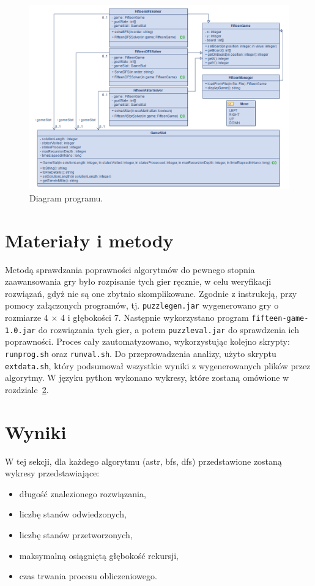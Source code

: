 \documentclass{classrep}
\begin{document}
    \clearpage

    \begin{figure}[!h]
        \includegraphics[width=\linewidth]{src/fifteen-diagram}
        \caption{Diagram programu.}
        \label{fig:fifteen-diagram}
    \end{figure}


    \section{Materiały i metody}\label{sec:materiay-i-metody}
    Metodą sprawdzania poprawności algorytmów do pewnego stopnia zaawansowania gry było rozpisanie tych gier ręcznie,
    w celu weryfikacji rozwiązań, gdyż nie są one zbytnio skomplikowane.
    Zgodnie z instrukcją, przy pomocy załączonych programów, tj. \texttt{puzzlegen.jar} wygenerowano gry o rozmiarze
    4 × 4 i głębokości 7.
    Następnie wykorzystano program \texttt{fifteen-game-1.0.jar} do rozwiązania tych gier, a potem \texttt{puzzleval.jar}
    do sprawdzenia ich poprawności.
    Proces cały zautomatyzowano, wykorzystując kolejno skrypty: \texttt{runprog.sh} oraz \texttt{runval.sh}.
    Do przeprowadzenia analizy, użyto skryptu \texttt{extdata.sh}, który podsumował wszystkie wyniki z wygenerowanych
    plików przez algorytmy.
    W języku python wykonano wykresy, które zostaną omówione w rozdziale~\ref{sec:wyniki}.

    \clearpage


    \section{Wyniki}\label{sec:wyniki}
    W tej sekcji, dla każdego algorytmu (astr, bfs, dfs) przedstawione zostaną wykresy przedstawiające:
    \begin{itemize}
        \item długość znalezionego rozwiązania,
        \item liczbę stanów odwiedzonych,
        \item liczbę stanów przetworzonych,
        \item maksymalną osiągniętą głębokość rekursji,
        \item czas trwania procesu obliczeniowego.
    \end{itemize}
\end{document}
